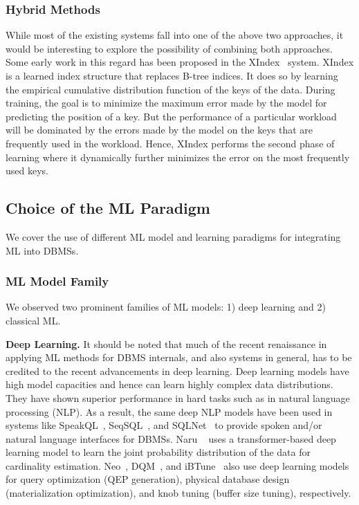\subsubsection{Hybrid Methods} While most of the existing systems fall into one of the above two approaches, it would be interesting to explore the possibility of combining both approaches.
Some early work in this regard has been proposed in the XIndex~\cite{xindex} system.
XIndex is a learned index structure that replaces B-tree indices.
It does so by learning the empirical cumulative distribution function of the keys of the data.
During training, the goal is to minimize the maximum error made by the model for predicting the position of a key.
But the performance of a particular workload will be dominated by the errors made by the model on the keys that are frequently used in the workload.
Hence, XIndex performs the second phase of learning where it dynamically further minimizes the error on the most frequently used keys.


\subsection{Choice of the ML Paradigm}
We cover the use of different ML model and learning paradigms for integrating ML into DBMSs.

\subsubsection{ML Model Family}
We observed two prominent families of ML models: 1) deep learning and 2) classical ML.

\vspace{2mm}
\noindent \textbf{Deep Learning.} It should be noted that much of the recent renaissance in applying ML methods for DBMS internals, and also systems in general, has to be credited to the recent advancements in deep learning.
Deep learning models have high model capacities and hence can learn highly complex data distributions.
They have shown superior performance in hard tasks such as in natural language processing (NLP).
As a result, the same deep NLP models have been used in systems like SpeakQL~\cite{speakql}, SeqSQL~\cite{seq2sql}, and SQLNet~\cite{sqlnet} to provide spoken and/or natural language interfaces for DBMSs.
Naru ~\cite{naru} uses a transformer-based deep learning model to learn the joint probability distribution of the data for cardinality estimation.
Neo~\cite{neo}, DQM~\cite{dqm}, and iBTune~\cite{ibtune} also use deep learning models for query optimization (QEP generation), physical database design (materialization optimization), and knob tuning (buffer size tuning), respectively.


